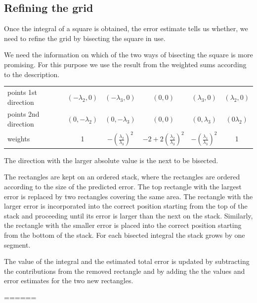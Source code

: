 \documentclass[11pt,a4paper]{report}
\begin{document}
\subsection{Refining the grid}
Once the integral of a square is obtained, the error estimate tells us
whether, we need to refine the grid by bisecting the square in use.

We need the information on which of the two ways of bisecting the
square is more promising. For this purpose we use the result from the
weighted sums according to the description.
\begin{center}
\begin{tabular}{|l|c|c|c|c|c|}
\hline
points 1st direction &$(-\lambda_2,0)$ & $(-\lambda_3,0)$ & $(0,0)$ & $(\lambda_3,0)$ & $(\lambda_2,0)$ \\
points 2nd direction &$(0,-\lambda_2)$ & $(0,-\lambda_3)$ & $(0,0)$ & $(0,\lambda_3)$ & $(0\lambda_2)$ \\
\hline
weights &1 & $-\left(\frac{\lambda_2}{\lambda_3}\right)^2$ &
$-2+2\left(\frac{\lambda_2}{\lambda_3}\right)^2$ & $-\left(\frac{\lambda_1}{\lambda_3}\right)^2$ &1\\ 
\hline
\end{tabular}
\end{center}
The direction with the larger absolute value is the next to be
bisected.

The rectangles are kept on an ordered stack, where the rectangles are
ordered according to the size of the predicted error. The top
rectangle with the largest error is replaced by two rectangles
covering the same area.  The rectangle with the larger error is
incorporated into the correct position starting from the top of the
stack and proceeding until its error is larger than the next on the
stack. Similarly, the rectangle with the smaller error is placed into
the correct position starting from the bottom of the stack.  For each
bisected integral the stack grows by one segment.



The value of the integral and the estimated total error is updated by
subtracting the contributions from the removed rectangle and by adding
the the values and error estimates for the two new rectangles.

======
\end{document}
